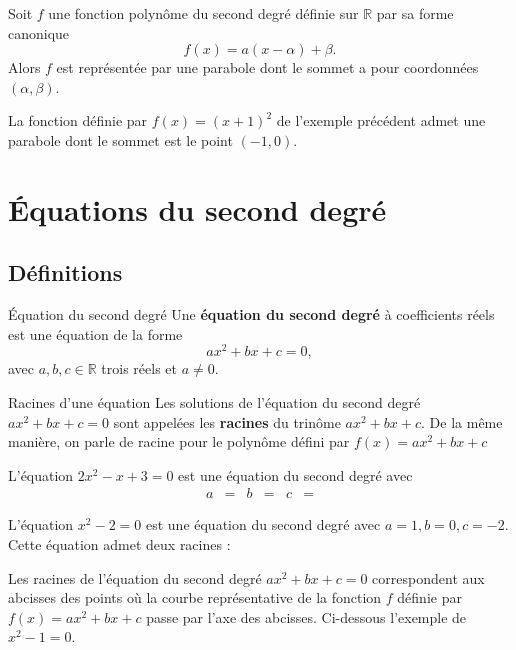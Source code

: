 \documentclass[11pt]{article}
\begin{document}
\begin{prop}
  Soit $f$ une fonction polynôme du second degré définie sur $\mathbb{R}$ par sa
  forme canonique
  \[
    f(x) = a(x-\alpha)+\beta.
  \]
  Alors $f$ est représentée par une parabole dont le sommet a pour coordonnées
  $(\alpha, \beta)$.
\end{prop}
\begin{exemple}
  La fonction définie par $f(x)=(x+1)^2$ de l'exemple précédent admet une
  parabole dont le sommet est le point $(-1, 0)$.
\end{exemple}

\section{Équations du second degré}

\subsection{Définitions} 
\begin{defi}{Équation du second degré}
  Une \textbf{équation du second degré} à coefficients réels est une équation de
  la forme
  \[
    ax^2+bx+c = 0,
  \]
  avec $a,b,c\in\mathbb{R}$ trois réels et $a\neq0$.
\end{defi}

\begin{defi}{Racines d'une équation}
  Les solutions de l'équation du second degré $ax^2+bx+c=0$ sont appelées les
  \textbf{racines} du trinôme $ax^2+bx+c$. De la même manière, on parle de racine
  pour le polynôme défini par $f(x)=ax^2+bx+c$
\end{defi}

\begin{exemple}
  L'équation $2x^2-x+3=0$ est une équation du second degré avec 
  \begin{align*}
  a &= &
  b &= &
  c &=
  \end{align*}
\end{exemple}

\begin{exemple}
  L'équation $x^2-2=0$ est une équation du second degré avec $a=1, b=0, c=-2$.
  Cette équation admet deux racines :
\end{exemple}

\begin{rmq}
Les racines de l'équation du second degré
  \(
    ax^2+bx+c = 0
  \)
  correspondent aux abcisses des points où la courbe représentative de la
  fonction $f$ définie par $f(x)=ax^2+bx+c$ passe par l'axe des abcisses.
  Ci-dessous l'exemple de $x^2-1=0$.
 \begin{center}
\end{center}
\end{rmq}
\end{document}
